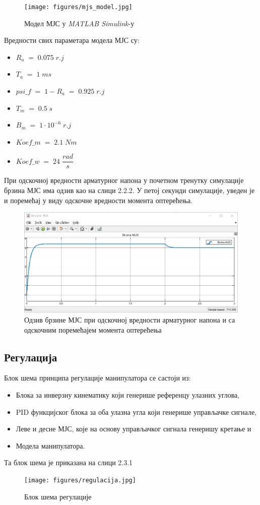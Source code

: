 \documentclass[12pt]{article}
\begin{document}
\begin{figure}[H]
    \centering
    \texttt{[image: figures/mjs\_model.jpg]}
    \caption{Модел МЈС у \textit{MATLAB Simulink}-у}
    \label{fig:мјс_simulink}
\end{figure}
Вредности свих параметара модела МЈС су:
\begin{itemize}
    \item $R_a\;=\;0.075\;r.j$
    \item $T_a\;=\;1\;ms$
    \item $psi\_f\;=\;1-R_a\;=\;0.925\;r.j$
    \item $T_m\;=\;0.5\;s$
    \item $B_m\;=\;1\cdot10^{-6}\;r.j$
    \item $Koef\_m\;=\;2.1\;Nm$
    \item $Koef\_w\;=\;24\;\dfrac{rad}{s}$
\end{itemize}
При одскочној вредности арматурног напона у почетном тренутку симулације брзина МЈС има одзив као на слици 2.2.2. У петој секунди симулације, уведен је и поремећај у виду одскочне вредности момента оптерећења.
\begin{figure}[H]
    \centering
    \includegraphics[width=15cm]{figures/brzina_mjs.jpg}
    \caption{Одзив брзине МЈС при одскочној вредности арматурног напона и са одскочним поремећајем момента оптерећења}
    \label{fig:брзина_мјс}
\end{figure}

\subsection{Регулација}
Блок шема принципа регулације манипулатора се састоји из:
\begin{itemize}
    \item Блока за инверзну кинематику који генерише референцу улазних углова,
    \item PID функцијског блока за оба улазна угла који генерише управљачке сигнале,
    \item Леве и десне МЈС, које на основу управљачког сигнала генеришу кретање и
    \item Модела манипулатора.
\end{itemize}
Та блок шема је приказана на слици 2.3.1
\begin{figure}[H]
    \centering
    \texttt{[image: figures/regulacija.jpg]}
    \caption{Блок шема регулације}
    \label{fig:регулација}
\end{figure}
\end{document}
